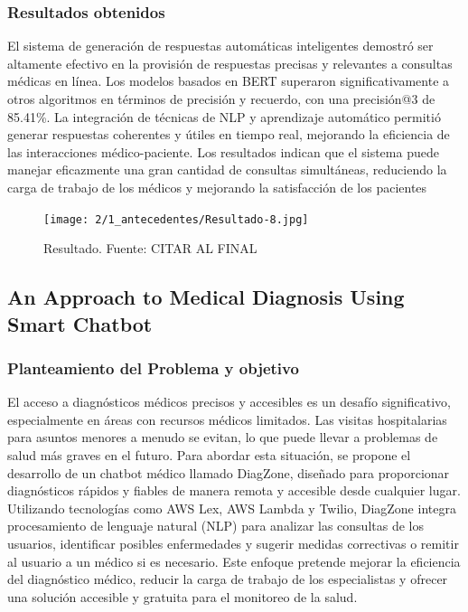 \subsubsection{Resultados obtenidos}
	El sistema de generación de respuestas automáticas inteligentes demostró ser altamente efectivo en la provisión de respuestas precisas y relevantes a consultas médicas en línea. Los modelos basados en BERT superaron significativamente a otros algoritmos en términos de precisión y recuerdo, con una precisión@3 de 85.41\%. La integración de técnicas de NLP y aprendizaje automático permitió generar respuestas coherentes y útiles en tiempo real, mejorando la eficiencia de las interacciones médico-paciente. Los resultados indican que el sistema puede manejar eficazmente una gran cantidad de consultas simultáneas, reduciendo la carga de trabajo de los médicos y mejorando la satisfacción de los pacientes
	
		\begin{figure}[h]
		\begin{center}
			\texttt{[image: 2/1\_antecedentes/Resultado-8.jpg]}
			\caption{Resultado. Fuente: CITAR AL FINAL }
		\end{center}
	\end{figure}
	
	
\subsection{An Approach to Medical Diagnosis Using Smart Chatbot} %

\subsubsection{Planteamiento del Problema y objetivo}
	El acceso a diagnósticos médicos precisos y accesibles es un desafío significativo, especialmente en áreas con recursos médicos limitados. Las visitas hospitalarias para asuntos menores a menudo se evitan, lo que puede llevar a problemas de salud más graves en el futuro. Para abordar esta situación, se propone el desarrollo de un chatbot médico llamado DiagZone, diseñado para proporcionar diagnósticos rápidos y fiables de manera remota y accesible desde cualquier lugar. Utilizando tecnologías como AWS Lex, AWS Lambda y Twilio, DiagZone integra procesamiento de lenguaje natural (NLP) para analizar las consultas de los usuarios, identificar posibles enfermedades y sugerir medidas correctivas o remitir al usuario a un médico si es necesario. Este enfoque pretende mejorar la eficiencia del diagnóstico médico, reducir la carga de trabajo de los especialistas y ofrecer una solución accesible y gratuita para el monitoreo de la salud.

